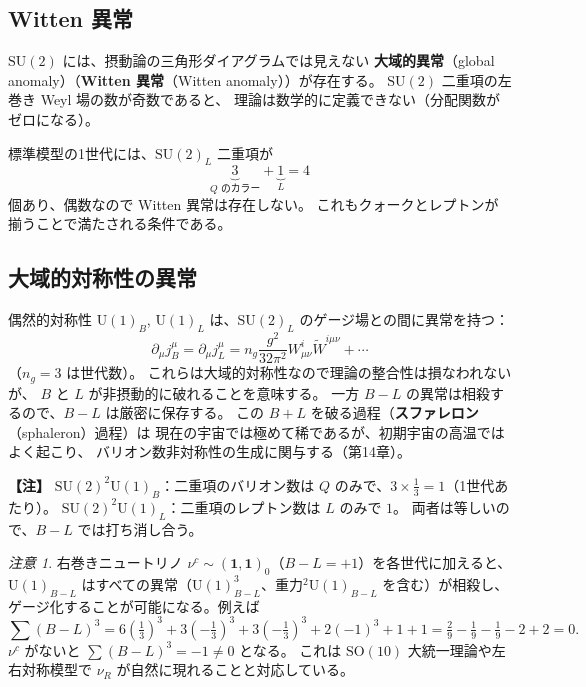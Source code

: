 \documentclass[uplatex,dvipdfmx,a4paper,11pt,openany]{jsbook}
\newcommand{\term}[2]{\textbf{#1}（#2）}
\newenvironment{note}{\vspace{1ex}\par\footnotesize\noindent\textbf{【注】}}{\par\vspace{1ex}}
\numberwithin{equation}{chapter}
\theoremstyle{definition}
\theoremstyle{plain}
\theoremstyle{remark}
\newtheorem{remark}{注意}[chapter]
\newcommand{\SU}{\mathrm{SU}}
\newcommand{\U}{\mathrm{U}}
\newcommand{\SO}{\mathrm{SO}}
\begin{document}
\subsection{Witten 異常}
$\SU(2)$ には、摂動論の三角形ダイアグラムでは見えない
\term{大域的異常}{global anomaly}（\term{Witten 異常}{Witten anomaly}）が存在する。
$\SU(2)$ 二重項の左巻き Weyl 場の数が奇数であると、
理論は数学的に定義できない（分配関数がゼロになる）。

標準模型の1世代には、$\SU(2)_L$ 二重項が
\begin{equation}
\underbrace{3}_{Q\text{ のカラー}}+\underbrace{1}_{L}=4
\end{equation}
個あり、偶数なので Witten 異常は存在しない。
これもクォークとレプトンが揃うことで満たされる条件である。
\subsection{大域的対称性の異常}
偶然的対称性 $\U(1)_B$, $\U(1)_L$ は、$\SU(2)_L$ のゲージ場との間に異常を持つ：
\begin{equation}
\partial_\mu j^\mu_B=\partial_\mu j^\mu_L
=n_g\frac{g^2}{32\pi^2}W^i_{\mu\nu}\tilde W^{i\mu\nu}+\cdots
\end{equation}
（$n_g=3$ は世代数）。
これらは大域的対称性なので理論の整合性は損なわれないが、
$B$ と $L$ が非摂動的に破れることを意味する。
一方 $B-L$ の異常は相殺するので、$B-L$ は厳密に保存する。
この $B+L$ を破る過程（\term{スファレロン}{sphaleron}過程）は
現在の宇宙では極めて稀であるが、初期宇宙の高温ではよく起こり、
バリオン数非対称性の生成に関与する（第14章）。
\begin{note}
$\SU(2)^2\U(1)_B$：二重項のバリオン数は $Q$ のみで、$3\times\frac13=1$（1世代あたり）。
$\SU(2)^2\U(1)_L$：二重項のレプトン数は $L$ のみで $1$。
両者は等しいので、$B-L$ では打ち消し合う。
\end{note}
\begin{remark}
右巻きニュートリノ $\nu^c\sim(\mathbf1,\mathbf1)_0$（$B-L=+1$）を各世代に加えると、
$\U(1)_{B-L}$ はすべての異常（$\U(1)_{B-L}^3$、重力$^2\U(1)_{B-L}$ を含む）が相殺し、
ゲージ化することが可能になる。例えば
\[
\sum(B-L)^3=6\left(\tfrac13\right)^3+3\left(-\tfrac13\right)^3+3\left(-\tfrac13\right)^3+2(-1)^3+1+1
=\tfrac29-\tfrac19-\tfrac19-2+2=0 .
\]
$\nu^c$ がないと $\sum(B-L)^3=-1\ne0$ となる。
これは $\SO(10)$ 大統一理論や左右対称模型で $\nu_R$ が自然に現れることと対応している。
\end{remark}
\end{document}
